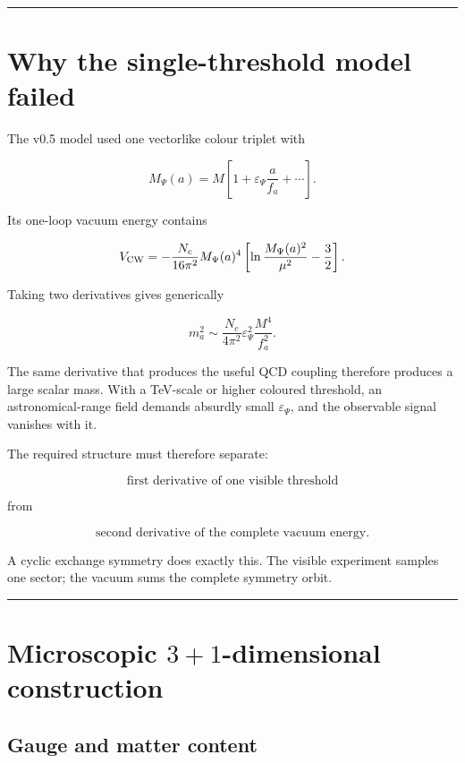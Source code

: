 \documentclass[11pt,a4paper]{article}
\begin{document}
\begin{center}\rule{0.5\linewidth}{0.5pt}\end{center}

\section{Why the single-threshold model
failed}\label{why-the-single-threshold-model-failed}

The v0.5 model used one vectorlike colour triplet with

\[
M_\Psi(a)=M\left[1+\varepsilon_\Psi\frac{a}{f_a}+\cdots\right].
\]

Its one-loop vacuum energy contains

\[
V_{\rm CW}
=-\frac{N_c}{16\pi^2}
M_\Psi(a)^4
\left[
\ln\frac{M_\Psi(a)^2}{\mu^2}-\frac32
\right].
\]

Taking two derivatives gives generically

\[
m_a^2
\sim
\frac{N_c}{4\pi^2}
\varepsilon_\Psi^2
\frac{M^4}{f_a^2}.
\]

The same derivative that produces the useful QCD coupling therefore
produces a large scalar mass. With a TeV-scale or higher coloured
threshold, an astronomical-range field demands absurdly small
\(\varepsilon_\Psi\), and the observable signal vanishes with it.

The required structure must therefore separate:

\[
\text{first derivative of one visible threshold}
\]

from

\[
\text{second derivative of the complete vacuum energy}.
\]

A cyclic exchange symmetry does exactly this. The visible experiment
samples one sector; the vacuum sums the complete symmetry orbit.

\begin{center}\rule{0.5\linewidth}{0.5pt}\end{center}

\section{\texorpdfstring{Microscopic \(3+1\)-dimensional
construction}{Microscopic 3+1-dimensional construction}}\label{microscopic-31-dimensional-construction}

\subsection{Gauge and matter content}\label{gauge-and-matter-content}
\end{document}
